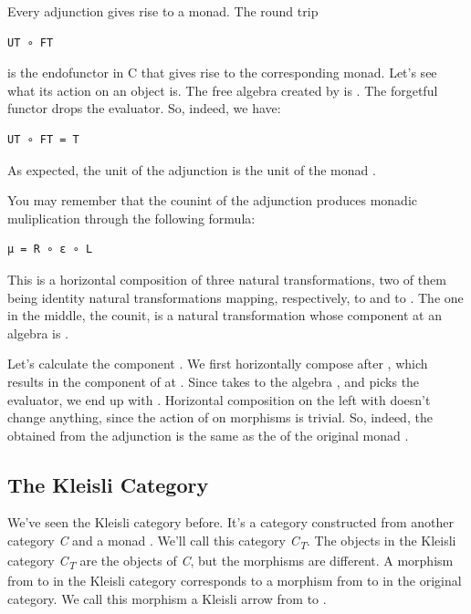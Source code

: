 Every adjunction gives rise to a monad. The round trip

\begin{verbatim}
UT ∘ FT
\end{verbatim}

is the endofunctor in C that gives rise to the corresponding monad.
Let's see what its action on an object  is. The free algebra
created by  is . The forgetful functor
 drops the evaluator. So, indeed, we have:

\begin{verbatim}
UT ∘ FT = T
\end{verbatim}

As expected, the unit of the adjunction is the unit of the monad
.

You may remember that the counint of the adjunction produces monadic
muliplication through the following formula:

\begin{verbatim}
μ = R ∘ ε ∘ L
\end{verbatim}

This is a horizontal composition of three natural transformations, two
of them being identity natural transformations mapping, respectively,
 to  and  to . The one in the
middle, the counit, is a natural transformation whose component at an
algebra  is .

Let's calculate the component . We first horizontally compose
 after , which results in the component of
 at . Since  takes  to the
algebra , and  picks the evaluator, we end
up with . Horizontal composition on the left with 
doesn't change anything, since the action of  on morphisms is
trivial. So, indeed, the  obtained from the adjunction is the
same as the  of the original monad .

\subsection{The Kleisli Category}\label{the-kleisli-category}

We've seen the Kleisli category before. It's a category constructed from
another category \emph{C} and a monad . We'll call this
category \emph{C\textsubscript{T}}. The objects in the Kleisli category
\emph{C\textsubscript{T}} are the objects of \emph{C}, but the morphisms
are different. A morphism  from  to  in
the Kleisli category corresponds to a morphism  from
 to  in the original category. We call this
morphism a Kleisli arrow from  to .

